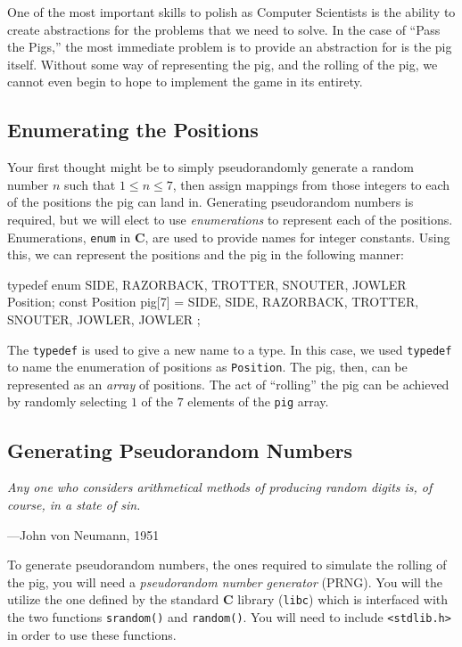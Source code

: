 \documentclass{article}
\begin{document}
\noindent
One of the most important skills to polish as Computer Scientists is
the ability to create abstractions for the problems that we need to
solve. In the case of ``Pass the Pigs,'' the most immediate problem is
to provide an abstraction for is the pig itself. Without some way of
representing the pig, and the rolling of the pig, we cannot even begin
to hope to implement the game in its entirety.

\subsection{Enumerating the Positions}\label{enum}

Your first thought might be to simply pseudorandomly generate a random
number $n$ such that $1 \le n \le 7$, then assign mappings from those
integers to each of the positions the pig can land in. Generating
pseudorandom numbers is required, but we will elect to use
\emph{enumerations} to represent each of the positions. Enumerations,
\texttt{enum} in \textbf{C}, are used to provide names for integer
constants. Using this, we can represent the positions and the pig in the
following manner:

\begin{clisting}{}
typedef enum { SIDE, RAZORBACK, TROTTER, SNOUTER, JOWLER } Position;
const Position pig[7] = {
  SIDE,
  SIDE,
  RAZORBACK,
  TROTTER,
  SNOUTER,
  JOWLER,
  JOWLER
};
\end{clisting}

The \texttt{typedef} is used to give a new name to a type. In this case,
we used \texttt{typedef} to name the enumeration of positions as
\texttt{Position}. The pig, then, can be represented as an \emph{array}
of positions. The act of ``rolling'' the pig can be achieved by randomly
selecting $1$ of the $7$ elements of the \texttt{pig} array.

\subsection{Generating Pseudorandom Numbers}
\textwidth
\epigraph{
\emph{Any one who considers arithmetical methods of producing random digits
is, of course, in a state of sin.}}{---John von Neumann, 1951}

\noindent
To generate pseudorandom numbers, the ones required to simulate the
rolling of the pig, you will need a \emph{pseudorandom number generator}
(PRNG). You will the utilize the one defined by the standard \textbf{C}
library (\texttt{libc}) which is interfaced with the two functions
\texttt{srandom()} and \texttt{random()}. You will need to include
\texttt{<stdlib.h>} in order to use these functions.
\end{document}
